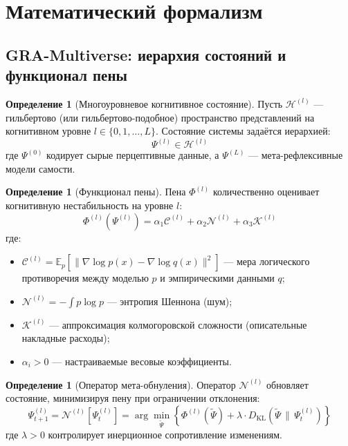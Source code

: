 \documentclass[11pt,a4paper]{article}
\theoremstyle{plain}
\theoremstyle{definition}
\newtheorem{definition}[theorem]{Определение}
\theoremstyle{remark}
\newcommand{\PsiState}{\Psi}
\newcommand{\Foam}{\Phi}
\newcommand{\NullOp}{\mathcal{N}}
\newcommand{\Hilbert}{\mathcal{H}}
\newcommand{\KL}{D_{\mathrm{KL}}}
\newcommand{\Fcog}{\Foam^{(l)}}
\begin{document}
\section{Математический формализм}
\label{sec:formalism}

\subsection{GRA-Multiverse: иерархия состояний и функционал пены}

\begin{definition}[Многоуровневое когнитивное состояние]
Пусть $\Hilbert^{(l)}$ --- гильбертово (или гильбертово-подобное) пространство представлений на когнитивном уровне $l \in \{0, 1, \dots, L\}$. Состояние системы задаётся иерархией:
\begin{equation}
    \boxed{\PsiState^{(l)} \in \Hilbert^{(l)}}
\end{equation}
где $\PsiState^{(0)}$ кодирует сырые перцептивные данные, а $\PsiState^{(L)}$ --- мета-рефлексивные модели самости.
\end{definition}

\begin{definition}[Функционал пены]
Пена $\Fcog$ количественно оценивает когнитивную нестабильность на уровне $l$:
\begin{equation}
    \boxed{\Fcog(\PsiState^{(l)}) = \alpha_1 \mathcal{C}^{(l)} + \alpha_2 \mathcal{N}^{(l)} + \alpha_3 \mathcal{K}^{(l)}}
    \label{eq:foam}
\end{equation}
где:
\begin{itemize}
    \item $\mathcal{C}^{(l)} = \mathbb{E}_{p}[\|\nabla \log p(x) - \nabla \log q(x)\|^2]$ --- мера логического противоречия между моделью $p$ и эмпирическими данными $q$;
    \item $\mathcal{N}^{(l)} = -\int p \log p$ --- энтропия Шеннона (шум);
    \item $\mathcal{K}^{(l)}$ --- аппроксимация колмогоровской сложности (описательные накладные расходы);
    \item $\alpha_i > 0$ --- настраиваемые весовые коэффициенты.
\end{itemize}
\end{definition}

\begin{definition}[Оператор мета-обнуления]
Оператор $\NullOp^{(l)}$ обновляет состояние, минимизируя пену при ограничении отклонения:
\begin{equation}
    \boxed{
    \PsiState^{(l)}_{t+1} = \NullOp^{(l)}[\PsiState^{(l)}_t] 
    = \arg\min_{\tilde{\Psi}} \left\{ 
        \Fcog(\tilde{\Psi}) + \lambda \cdot \KL\!\left(\tilde{\Psi} \,\|\, \PsiState^{(l)}_t\right) 
    \right\}
    }
    \label{eq:nullification}
\end{equation}
где $\lambda > 0$ контролирует инерционное сопротивление изменениям.
\end{definition}
\end{document}
